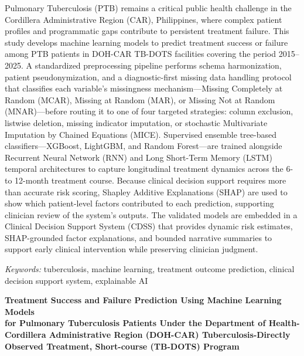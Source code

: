 \documentclass[12pt]{article}
\begin{document}
{

Pulmonary Tuberculosis (PTB) remains a critical public health challenge in the Cordillera Administrative Region (CAR), Philippines, where complex patient profiles and programmatic gaps contribute to persistent treatment failure. This study develops machine learning models to predict treatment success or failure among PTB patients in DOH-CAR TB-DOTS facilities covering the period 2015--2025. A standardized preprocessing pipeline performs schema harmonization, patient pseudonymization, and a diagnostic-first missing data handling protocol that classifies each variable's missingness mechanism---Missing Completely at Random (MCAR), Missing at Random (MAR), or Missing Not at Random (MNAR)---before routing it to one of four targeted strategies: column exclusion, listwise deletion, missing indicator imputation, or stochastic Multivariate Imputation by Chained Equations (MICE). Supervised ensemble tree-based classifiers---XGBoost, LightGBM, and Random Forest---are trained alongside Recurrent Neural Network (RNN) and Long Short-Term Memory (LSTM) temporal architectures to capture longitudinal treatment dynamics across the 6- to 12-month treatment course. Because clinical decision support requires more than accurate risk scoring, Shapley Additive Explanations (SHAP) are used to show which patient-level factors contributed to each prediction, supporting clinician review of the system's outputs. The validated models are embedded in a Clinical Decision Support System (CDSS) that provides dynamic risk estimates, SHAP-grounded factor explanations, and bounded narrative summaries to support early clinical intervention while preserving clinician judgment.

\noindent\hspace*{0.5in}\textit{Keywords:} tuberculosis, machine learning, treatment outcome prediction, clinical decision support system, explainable AI
}

\newpage

\newpage
\begin{center}
{\bfseries Treatment Success and Failure Prediction Using Machine Learning Models\\
for Pulmonary Tuberculosis Patients Under the Department of Health-Cordillera Administrative Region (DOH-CAR) Tuberculosis-Directly Observed Treatment, Short-course (TB-DOTS) Program}
\end{center}
\end{document}
